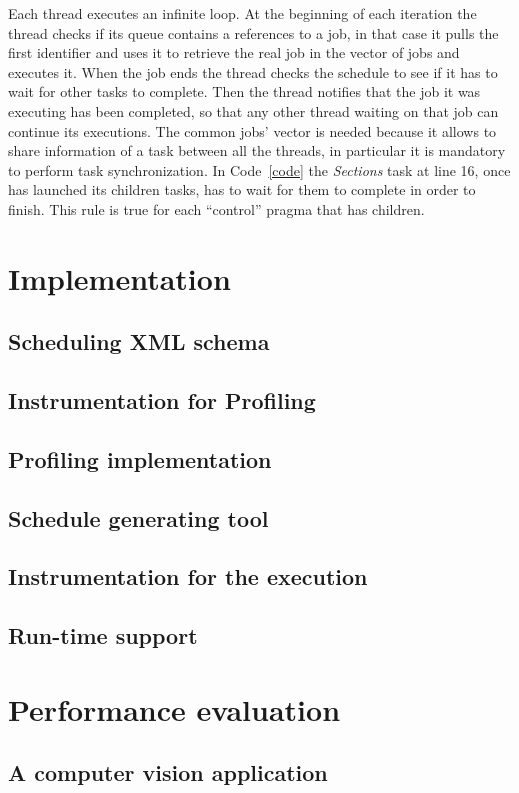 \documentclass[a4paper,11pt,oneside]{book}
\begin{document}
Each thread executes an infinite loop. At the beginning of each iteration the thread checks if its queue contains a references to a job, in that case it pulls the first identifier and uses it to retrieve the real job in the vector of jobs and executes it. When the job ends the thread checks the schedule to see if it has to wait for other tasks to complete. Then the thread notifies that the job it was executing has been completed, so that any other thread waiting on that job can continue its executions. The common jobs’ vector is needed because it allows to share information of a task between all the threads, in particular it is mandatory to perform task synchronization. In Code~\ref{code} the \emph{Sections} task at line 16, once has launched its children tasks, has to wait for them to complete in order to finish. This rule is true for each “control” pragma that has children. 


\chapter{Implementation}
\section{Scheduling XML schema}
\section{Instrumentation for Profiling}
\section{Profiling implementation}
\section{Schedule generating tool}
\section{Instrumentation for the execution}
\section{Run-time support}

\chapter{Performance evaluation}
\section{A computer vision application}
\end{document}

